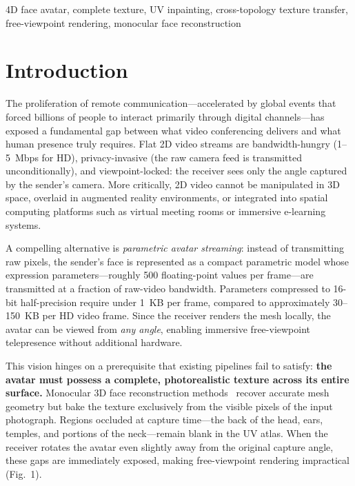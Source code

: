 \documentclass[conference]{IEEEtran}
\begin{document}
\begin{IEEEkeywords}
4D face avatar, complete texture, UV inpainting, cross-topology texture
transfer, free-viewpoint rendering, monocular face reconstruction
\end{IEEEkeywords}

\section{Introduction}

The proliferation of remote communication---accelerated by global events that
forced billions of people to interact primarily through digital channels---has
exposed a fundamental gap between what video conferencing delivers and what
human presence truly requires. Flat 2D video streams are bandwidth-hungry
(1--5~Mbps for HD), privacy-invasive (the raw camera feed is transmitted
unconditionally), and viewpoint-locked: the receiver sees only the angle
captured by the sender's camera. More critically, 2D video cannot be
manipulated in 3D space, overlaid in augmented reality environments, or
integrated into spatial computing platforms such as virtual meeting rooms or
immersive e-learning systems.

A compelling alternative is \emph{parametric avatar streaming}: instead of
transmitting raw pixels, the sender's face is represented as a compact
parametric model whose expression parameters---roughly 500 floating-point
values per frame---are transmitted at a fraction of raw-video bandwidth.
Parameters compressed to 16-bit half-precision require under 1~KB per frame,
compared to approximately 30--150~KB per HD video frame. Since the receiver
renders the mesh locally, the avatar can be viewed from \emph{any angle},
enabling immersive free-viewpoint telepresence without additional hardware.

This vision hinges on a prerequisite that existing pipelines fail to satisfy:
\textbf{the avatar must possess a complete, photorealistic texture across its
entire surface.} Monocular 3D face reconstruction methods~\cite{feng2021deca}
recover accurate mesh geometry but bake the texture exclusively from the visible
pixels of the input photograph. Regions occluded at capture time---the back of
the head, ears, temples, and portions of the neck---remain blank in the UV
atlas. When the receiver rotates the avatar even slightly away from the original
capture angle, these gaps are immediately exposed, making free-viewpoint
rendering impractical (Fig.~1).
\end{document}
